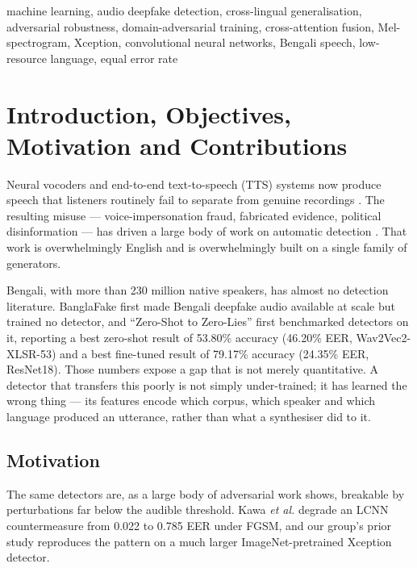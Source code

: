 \documentclass[conference]{IEEEtran}
\begin{document}
\begin{IEEEkeywords}
machine learning, audio deepfake detection, cross-lingual generalisation,
adversarial robustness, domain-adversarial training, cross-attention fusion,
Mel-spectrogram, Xception, convolutional neural networks, Bengali speech,
low-resource language, equal error rate
\end{IEEEkeywords}

\section{Introduction, Objectives, Motivation and Contributions}
Neural vocoders and end-to-end text-to-speech (TTS) systems now produce speech
that listeners routinely fail to separate from genuine recordings
\cite{kong2020hifigan,kumar2019melgan,prenger2019waveglow,yamamoto2020pwg,kim2021vits}.
The resulting misuse --- voice-impersonation fraud, fabricated evidence,
political disinformation --- has driven a large body of work on automatic
detection \cite{todisco2019asvspoof,frank2021wavefake}. That work is
overwhelmingly English and is overwhelmingly built on a single family of
generators.

Bengali, with more than 230 million native speakers, has almost no detection
literature. BanglaFake \cite{fahad2025banglafake} first made Bengali deepfake
audio available at scale but trained no detector, and ``Zero-Shot to
Zero-Lies'' \cite{samu2025zeroshot} first benchmarked detectors on it,
reporting a best zero-shot result of 53.80\% accuracy (46.20\% EER,
Wav2Vec2-XLSR-53) and a best fine-tuned result of 79.17\% accuracy (24.35\%
EER, ResNet18). Those numbers expose a gap that is not merely quantitative. A
detector that transfers this poorly is not simply under-trained; it has
learned the wrong thing --- its features encode which corpus, which speaker
and which language produced an utterance, rather than what a synthesiser did
to it.

\subsection{Motivation}
The same detectors are, as a large body of adversarial work shows, breakable
by perturbations far below the audible threshold. Kawa \emph{et al.}
\cite{kawa2023lcnn} degrade an LCNN countermeasure from 0.022 to 0.785 EER
under FGSM, and our group's prior study \cite{ahmed2026melspec} reproduces the
pattern on a much larger ImageNet-pretrained Xception detector.
\end{document}
